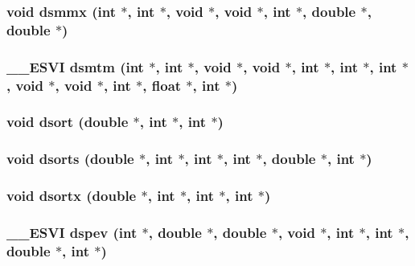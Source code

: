 \subsubsection{\setlength{\rightskip}{0pt plus 5cm}void dsmmx (int $\ast$, int $\ast$, void $\ast$, void $\ast$, int $\ast$, double $\ast$, double $\ast$)}\label{essl_8h_30535dd6af8ed32014e5d43900fcf9f0}


\subsubsection{\setlength{\rightskip}{0pt plus 5cm}\_\-\_\-ESVI dsmtm (int $\ast$, int $\ast$, void $\ast$, void $\ast$, int $\ast$, int $\ast$, int $\ast$, void $\ast$, void $\ast$, int $\ast$, float $\ast$, int $\ast$)}\label{essl_8h_ca9d135ce5b8ab6f5bc27ee258e7280f}


\subsubsection{\setlength{\rightskip}{0pt plus 5cm}void dsort (double $\ast$, int $\ast$, int $\ast$)}\label{essl_8h_3474fc7282a5e373dba8975569cced84}


\subsubsection{\setlength{\rightskip}{0pt plus 5cm}void dsorts (double $\ast$, int $\ast$, int $\ast$, int $\ast$, double $\ast$, int $\ast$)}\label{essl_8h_c08510a49646ad942c8bf524f9316d7d}


\subsubsection{\setlength{\rightskip}{0pt plus 5cm}void dsortx (double $\ast$, int $\ast$, int $\ast$, int $\ast$)}\label{essl_8h_19d39a3742e8f9fd801e37df20ed2afc}


\subsubsection{\setlength{\rightskip}{0pt plus 5cm}\_\-\_\-ESVI dspev (int $\ast$, double $\ast$, double $\ast$, void $\ast$, int $\ast$, int $\ast$, double $\ast$, int $\ast$)}\label{essl_8h_7a2d1c28d286b67b4c5ab65bf5cc1f6f}


